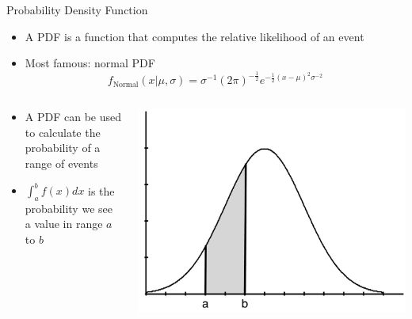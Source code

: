 \documentclass[aspectratio=169]{beamer}
\begin{document}
\begin{frame}{Probability Density Function}

\begin{itemize}
\item A PDF is a function that computes the relative likelihood of an event
\item Most famous: normal PDF
	$$f_{\textrm{Normal}}(x | \mu, \sigma) = \sigma^{-1} (2\pi)^{-\frac{1}{2}}
		e^{-\frac{1}{2}(x - \mu)^2\sigma^{-2}}$$
\end{itemize}
\begin{columns}
\begin{column}{0.5\textwidth}
\begin{itemize}
\item A PDF can be used to calculate the probability of a range of events
\item $\int_a^b f(x)dx$ is the probability we see a value in range $a$ to $b$
\end{itemize}
\end{column}
\begin{column}{0.5\textwidth}
\includegraphics[width=1\textwidth]{lectModel1/normalPDFab.pdf}
\end{column}
\end{columns}
\end{frame}

\end{document}
